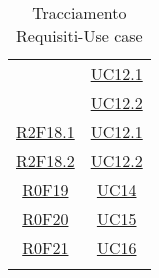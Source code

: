 \begin{longtable}{|c|c|}
& \hyperlink{UC12.1}{UC12.1}\\
& \hyperlink{UC12.2}{UC12.2}\\
\hline
\hyperlink{R2F18.1}{R2F18.1} & \hyperlink{UC12.1}{UC12.1}\\
\hline
\hyperlink{R2F18.2}{R2F18.2} & \hyperlink{UC12.2}{UC12.2}\\
\hline
\hyperlink{R0F19}{R0F19} & \hyperlink{UC14}{UC14}\\
\hline
\hyperlink{R0F20}{R0F20} & \hyperlink{UC15}{UC15}\\
\hline
\hyperlink{R0F21}{R0F21} & \hyperlink{UC16}{UC16}\\
\hline
\caption[Tracciamento Requisiti-Use case]{Tracciamento Requisiti-Use case}
\label{tabella:requi-usecase}
\end{longtable}
\clearpage

